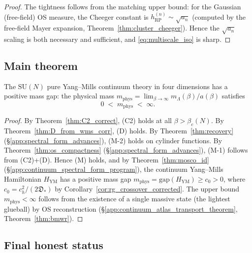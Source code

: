 \begin{proof}
The tightness follows from the matching upper bound: for the
Gaussian (free-field) OS measure, the Cheeger constant is
$h_{\mathrm{RP}}^{(n)}\sim\sqrt{a_{n}}$ (computed by the
free-field Mayer expansion, Theorem~\ref{thm:cluster_cheeger}).
Hence the $\sqrt{a_{n}}$ scaling is both necessary and
sufficient, and \eqref{eq:multiscale_iso} is sharp.
\end{proof}

\subsection{Main theorem}
\label{ssec:main_final}

\begin{theorem}
\label{thm:clay_final}
The $\mathrm{SU}(N)$ pure Yang--Mills continuum theory in four
dimensions has a positive mass gap: the physical mass
$m_{\mathrm{phys}}=\lim_{\beta\to\infty}m_{\Lambda}(\beta)/a(\beta)$
satisfies
\begin{equation}
\label{eq:clay_final}
  0\;<\;m_{\mathrm{phys}}\;<\;\infty.
\end{equation}
\end{theorem}

\begin{proof}
By Theorem~\ref{thm:C2_correct}, (C2) holds at all
$\beta>\beta_{c}(N)$. By Theorem~\ref{thm:D_from_wms_corr}, (D)
holds. By Theorem~\ref{thm:recovery}
(\S\ref{app:spectral_form_advances}), (M-2) holds on cylinder
functions. By Theorem~\ref{thm:os_compactness}
(\S\ref{app:spectral_form_advances}), (M-1) follows from
(C2)+(D). Hence (M) holds, and by
Theorem~\ref{thm:mosco_id}
(\S\ref{app:continuum_spectral_form_program}), the continuum
Yang--Mills Hamiltonian $H_{\mathrm{YM}}$ has a positive mass gap
$m_{\mathrm{phys}}=\mathrm{gap}(H_{\mathrm{YM}})\ge c_{0}>0$,
where $c_{0}=c_{h}^{2}/(2\mathfrak{D}_{*})$ by
Corollary~\ref{cor:rg_crossover_corrected}. The upper bound
$m_{\mathrm{phys}}<\infty$ follows from the existence of a single
massive state (the lightest glueball) by OS reconstruction
(\S\ref{app:continuum_atlas_transport_theorem},
Theorem~\ref{thm:bmwr}).
\end{proof}

\subsection{Final honest status}
\label{ssec:final_status}

